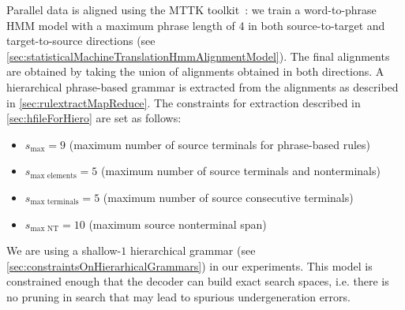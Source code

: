 Parallel data is aligned using the MTTK
toolkit~\citep{deng-and-byrne:2008:ASLP}:
we train a word-to-phrase HMM model with a maximum phrase length of 4 in both
source-to-target and target-to-source
directions (see \autoref{sec:statisticalMachineTranslationHmmAlignmentModel}).
The final alignments are obtained
by taking the union of alignments obtained in both directions.
A hierarchical phrase-based grammar
is extracted from the alignments as described
in \autoref{sec:rulextractMapReduce}. The constraints for extraction
described in \autoref{sec:hfileForHiero} are set as follows:
%
\begin{itemize}
  \item $s_{\text{max}} = 9$ (maximum number of source terminals for phrase-based rules)
  \item $s_{\text{max elements}} = 5$ (maximum number of source terminals and nonterminals)
  \item $s_{\text{max terminals}} = 5$ (maximum number of source consecutive terminals)
  \item $s_{\text{max NT}} = 10$ (maximum source nonterminal span)
\end{itemize}
%
We are using a shallow-$1$ hierarchical
grammar (see \autoref{sec:constraintsOnHierarhicalGrammars}) in our
experiments.
This model is constrained enough that the decoder can build exact search spaces,
i.e. there is no pruning in search that may lead to spurious undergeneration errors.

